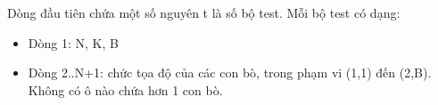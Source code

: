 Dòng đầu tiên chứa một số nguyên t là số bộ test. Mỗi bộ test có dạng:  
\begin{itemize}
	\item     Dòng 1: N, K, B   
	\item     Dòng 2..N+1: chức tọa độ của các con bò, trong phạm vi (1,1) đến (2,B). Không có ô nào chứa hơn 1 con bò.   
\end{itemize}